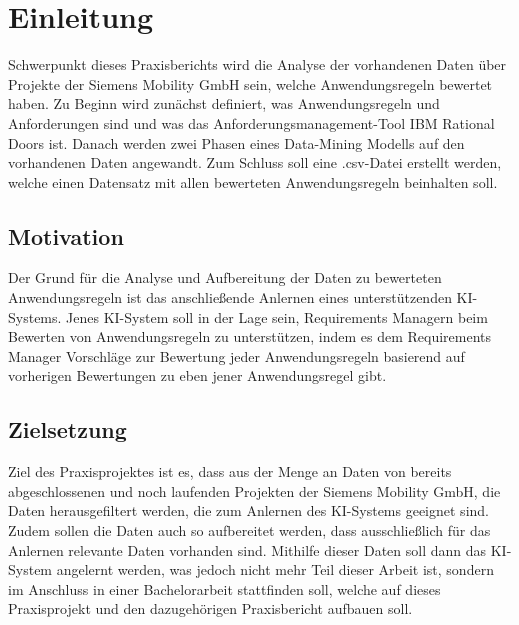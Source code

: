 \chapter{Einleitung}
\label{chap:einleitung}

Schwerpunkt dieses Praxisberichts wird die Analyse der vorhandenen Daten über Projekte der Siemens Mobility GmbH sein, welche Anwendungsregeln bewertet haben. Zu Beginn wird zunächst definiert, was
Anwendungsregeln und Anforderungen sind und was das Anforderungsmanagement-Tool IBM Rational Doors ist. Danach werden zwei Phasen eines Data-Mining Modells auf den vorhandenen Daten angewandt. Zum Schluss
soll eine .csv-Datei erstellt werden, welche einen Datensatz mit allen bewerteten Anwendungsregeln beinhalten soll. 

\section{Motivation}
\label{chap:Motivation}
Der Grund für die Analyse und Aufbereitung der Daten zu bewerteten Anwendungsregeln ist das anschließende Anlernen eines unterstützenden KI-Systems. Jenes KI-System soll in der Lage sein,
Requirements Managern beim Bewerten von Anwendungsregeln zu unterstützen, indem es dem Requirements Manager Vorschläge zur Bewertung jeder Anwendungsregeln basierend auf vorherigen Bewertungen zu
eben jener Anwendungsregel gibt.

\section{Zielsetzung}
\label{chap:Zielsetzung}
Ziel des Praxisprojektes ist es, dass aus der Menge an Daten von bereits abgeschlossenen und noch laufenden Projekten der Siemens Mobility GmbH, die Daten herausgefiltert werden, die 
zum Anlernen des KI-Systems geeignet sind. Zudem sollen die Daten auch so aufbereitet werden, dass ausschließlich für das Anlernen relevante Daten vorhanden sind. Mithilfe dieser Daten
soll dann das KI-System angelernt werden, was jedoch nicht mehr Teil dieser Arbeit ist, sondern im Anschluss in einer Bachelorarbeit stattfinden soll, welche auf dieses Praxisprojekt und den 
dazugehörigen Praxisbericht aufbauen soll.

